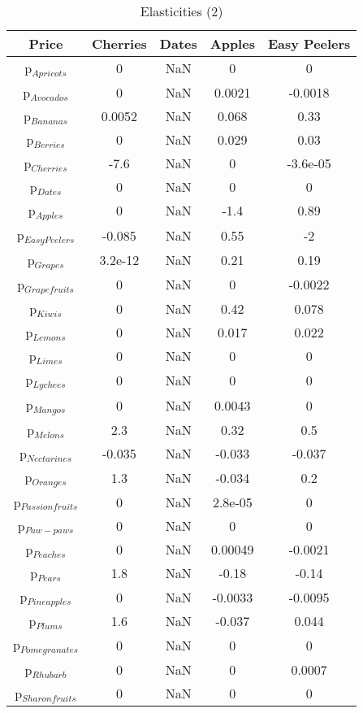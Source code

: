 \documentclass[11pt]{article}
\begin{document}
\begin{table}[h]
\caption{Elasticities (2)}
\label{Table: elasticities 2}
\begin{center}
\begin{tabular}{ccccc}
Price & Cherries & Dates & Apples & Easy Peelers \\ \hline
p$_{Apricots}$ & 0 & NaN & 0 & 0 \\ 
p$_{Avocados}$ & 0 & NaN & 0.0021 & -0.0018 \\ 
p$_{Bananas}$ & 0.0052 & NaN & 0.068 & 0.33 \\ 
p$_{Berries}$ & 0 & NaN & 0.029 & 0.03 \\ 
p$_{Cherries}$ & -7.6 & NaN & 0 & -3.6e-05 \\ 
p$_{Dates}$ & 0 & NaN & 0 & 0 \\ 
p$_{Apples}$ & 0 & NaN & -1.4 & 0.89 \\ 
p$_{Easy Peelers}$ & -0.085 & NaN & 0.55 & -2 \\ 
p$_{Grapes}$ & 3.2e-12 & NaN & 0.21 & 0.19 \\ 
p$_{Grapefruits}$ & 0 & NaN & 0 & -0.0022 \\ 
p$_{Kiwis}$ & 0 & NaN & 0.42 & 0.078 \\ 
p$_{Lemons}$ & 0 & NaN & 0.017 & 0.022 \\ 
p$_{Limes}$ & 0 & NaN & 0 & 0 \\ 
p$_{Lychees}$ & 0 & NaN & 0 & 0 \\ 
p$_{Mangos}$ & 0 & NaN & 0.0043 & 0 \\ 
p$_{Melons}$ & 2.3 & NaN & 0.32 & 0.5 \\ 
p$_{Nectarines}$ & -0.035 & NaN & -0.033 & -0.037 \\ 
p$_{Oranges}$ & 1.3 & NaN & -0.034 & 0.2 \\ 
p$_{Passion fruits}$ & 0 & NaN & 2.8e-05 & 0 \\ 
p$_{Paw-paws}$ & 0 & NaN & 0 & 0 \\ 
p$_{Peaches}$ & 0 & NaN & 0.00049 & -0.0021 \\ 
p$_{Pears}$ & 1.8 & NaN & -0.18 & -0.14 \\ 
p$_{Pineapples}$ & 0 & NaN & -0.0033 & -0.0095 \\ 
p$_{Plums}$ & 1.6 & NaN & -0.037 & 0.044 \\ 
p$_{Pomegranates}$ & 0 & NaN & 0 & 0 \\ 
p$_{Rhubarb}$ & 0 & NaN & 0 & 0.0007 \\ 
p$_{Sharon fruits}$ & 0 & NaN & 0 & 0 \\ 
\end{tabular}
\end{center}
\end{table}
\end{document}
